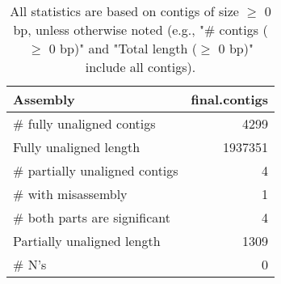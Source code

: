 \documentclass[12pt,a4paper]{article}
\begin{document}
\begin{table}[ht]
\begin{center}
\caption{All statistics are based on contigs of size $\geq$ 0 bp, unless otherwise noted (e.g., "\# contigs ($\geq$ 0 bp)" and "Total length ($\geq$ 0 bp)" include all contigs).}
\begin{tabular}{|l*{1}{|r}|}
\hline
Assembly & final.contigs \\ \hline
\# fully unaligned contigs & 4299 \\ \hline
Fully unaligned length & 1937351 \\ \hline
\# partially unaligned contigs & 4 \\ \hline
\hspace{5mm}\# with misassembly & 1 \\ \hline
\hspace{5mm}\# both parts are significant & 4 \\ \hline
Partially unaligned length & 1309 \\ \hline
\# N's & 0 \\ \hline
\end{tabular}
\end{center}
\end{table}
\end{document}
